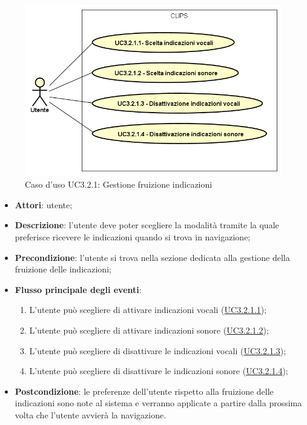 \documentclass[../AnalisiDeiRequisiti.tex]{subfiles}
\begin{document}
\begin{figure}[H]
	\centering
	\includegraphics[scale=0.95, width=\textwidth]{img/UC3-2-1.png}
	\caption{Caso d'uso UC3.2.1: Gestione fruizione indicazioni}\label{fig:UC3.2.1} 
\end{figure}
\begin{itemize}
	\item \textbf{Attori}: utente;
	\item \textbf{Descrizione}: l'utente deve poter scegliere la modalità tramite la quale preferisce ricevere le indicazioni quando si trova in navigazione; 
	\item \textbf{Precondizione}: l'utente si trova nella sezione dedicata alla gestione della fruizione delle indicazioni;
	
	\item \textbf{Flusso principale degli eventi}:
	\begin{enumerate}
		\item L'utente può scegliere di attivare indicazioni vocali (\hyperlink{UC3.2.1.1}{UC3.2.1.1});
		\item L'utente può scegliere di attivare indicazioni sonore (\hyperlink{UC3.2.1.2}{UC3.2.1.2});
		\item L'utente può scegliere di disattivare le indicazioni vocali (\hyperlink{UC3.2.1.3}{UC3.2.1.3});
		\item L'utente può scegliere di disattivare le indicazioni sonore (\hyperlink{UC3.2.1.4}{UC3.2.1.4});
		
	\end{enumerate}
	\item \textbf{Postcondizione}: le preferenze dell'utente rispetto alla fruizione delle indicazioni sono note al sistema e verranno applicate a partire dalla prossima volta che l'utente avvierà la navigazione.
\end{itemize}
\hypertarget{UC3.2.1.1}{}
\end{document}

